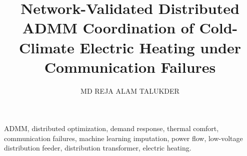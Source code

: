 \documentclass{ieeeaccess}
\begin{document}
\title{Network-Validated Distributed ADMM Coordination of Cold-Climate Electric Heating under Communication Failures}
\author{MD REJA ALAM TALUKDER}
\address{University of Qu\'ebec at Trois-Rivi\`eres, Trois-Rivi\`eres, QC G8Z 4M3, Canada (e-mail: Md.Reja.Alam.Talukder@uqtr.ca)}

\begin{abstract}

\end{abstract}

\begin{IEEEkeywords}
ADMM, distributed optimization, demand response, thermal comfort, communication failures, machine learning imputation, power flow, low-voltage distribution feeder, distribution transformer, electric heating.
\end{IEEEkeywords}

\maketitle
\end{document}
